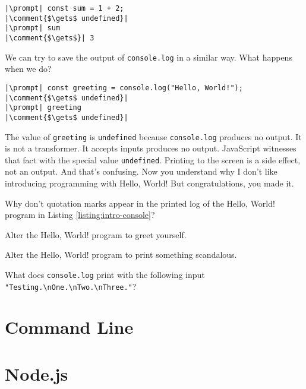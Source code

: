 \suppresslinenumbers
\begin{lstlisting}[escapeinside=||]
|\prompt| const sum = 1 + 2;
|\comment{$\gets$ undefined}|
|\prompt| sum
|\comment{$\gets$}| 3
\end{lstlisting}

We can try to save the output of \texttt{console.log} in a similar way. What happens when we do?

\begin{lstlisting}[escapeinside=||]
|\prompt| const greeting = console.log("Hello, World!");
|\comment{$\gets$ undefined}|
|\prompt| greeting
|\comment{$\gets$ undefined}|
\end{lstlisting}

The value of \texttt{greeting} is \texttt{undefined} because \texttt{console.log} produces no output. It is not a transformer. It accepts inputs produces no output. JavaScript witnesses that fact with the special value \texttt{undefined}. Printing to the screen is a side effect, not an output. And that's confusing. Now you understand why I don't like introducing programming with Hello, World! But congratulations, you made it.

\begin{question}
  Why don't quotation marks appear in the printed log of the Hello, World! program in Listing \ref{listing:intro-console}?
\end{question}

\begin{question}
  Alter the Hello, World! program to greet yourself.
\end{question}

\begin{question}
  Alter the Hello, World! program to print something scandalous.
\end{question}

\begin{question}
  What does \texttt{console.log} print with the following input \texttt{"Testing.\textbackslash nOne.\textbackslash nTwo.\textbackslash nThree."}?
\end{question}

\section{Command Line}

\section{Node.js}
